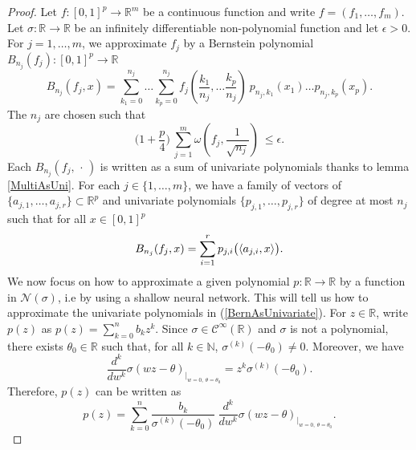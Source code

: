 \documentclass[anon,12pt]{colt2021} %
\begin{document}
\begin{proof}
Let $f: [0,1]^{p} \rightarrow \mathbb{R}^{m}$ be a continuous function and write $f=(f_{1}, \dots, f_{m})$. Let $\sigma: \mathbb{R} \rightarrow \mathbb{R}$ be an infinitely differentiable non-polynomial function and let $\epsilon > 0$. For $j=1, \dots, m$, we approximate $f_{j}$ by a Bernstein polynomial $B_{n_{j}}(f_{j}): [0,1]^{p} \rightarrow \mathbb{R}$
\begin{equation*}
    B_{n_{j}}(f_{j}, x) = \sum_{k_{1}=0}^{n_{j}} \dots \sum_{k_{p}=0}^{n_{j}} f_{j}(\frac{k_{1}}{n_{j}}, \dots \frac{k_{p}}{n_{j}}) \ p_{n_{j}, k_{1}}(x_{1}) \dots p_{n_{j}, k_{p}}(x_{p}).
\end{equation*}
The $n_{j}$ are chosen such that
\begin{equation} \label{choicen}
   \bigg(1 + \frac{p}{4} \bigg) \  \sum_{j=1}^{m} \omega(f_{j}, \frac{1}{\sqrt{n_{j}}}) \ \leq \epsilon.
\end{equation}
Each $B_{n_{j}}(f_{j}, \, \cdot \,)$ is written as a sum of univariate polynomials thanks to lemma \ref{MultiAsUni}. For each $j \in \lbrace 1, \dots, m \rbrace$, we have a family of vectors of $\lbrace a_{j,1}, \dots, a_{j,r} \rbrace \subset \mathbb{R}^{p}$ and univariate polynomials $\lbrace p_{j,1}, \dots, p_{j,r}\rbrace$ of degree at most $n_{j}$ such that for all $x \in [0,1]^{p}$
\begin{equation} \label{BernAsUnivariate}
    B_{n_{j}}(f_{j},x) = \sum_{i=1}^{r} p_{\tiny{j,i}} \big( \langle a_{j,i}, x \rangle \big).
\end{equation}
We now focus on how to approximate a given polynomial $p: \mathbb{R} \rightarrow \mathbb{R}$ by a function in $\mathcal{N}(\sigma)$, i.e by using a shallow neural network. This will tell us how to approximate the univariate polynomials in (\ref{BernAsUnivariate}). For $z \in \mathbb{R}$, write $p(z)$ as $p(z) = \sum_{k=0}^{n} b_{k}z^{k}$. Since $\sigma \in \mathcal{C}^{\infty}(\mathbb{R})$ and $\sigma$ is not a polynomial, there exists $\theta_{0} \in \mathbb{R}$ such that, for all $k \in \mathbb{N}$, $\sigma^{(k)}(-\theta_{0}) \neq 0$.
Moreover, we have
\begin{equation*}
    \frac{d^{k}}{dw^{k}} \sigma(wz - \theta)_{\big|_{ \scriptstyle w=0, \ \theta = \theta_{0}}} = z^{k} \sigma^{(k)}(- \theta_{0}).
\end{equation*}
Therefore, $p(z)$ can be written as
\begin{equation} \label{pDer}
    p(z) = \sum_{k=0}^{n} \frac{b_{k}}{\sigma^{(k)}(- \theta_{0})} \ \frac{d^{k}}{dw^{k}} \sigma(wz - \theta)_{\big|_{ \scriptstyle w=0, \ \theta = \theta_{0}}}.

\end{equation}
\end{proof}
\end{document}
